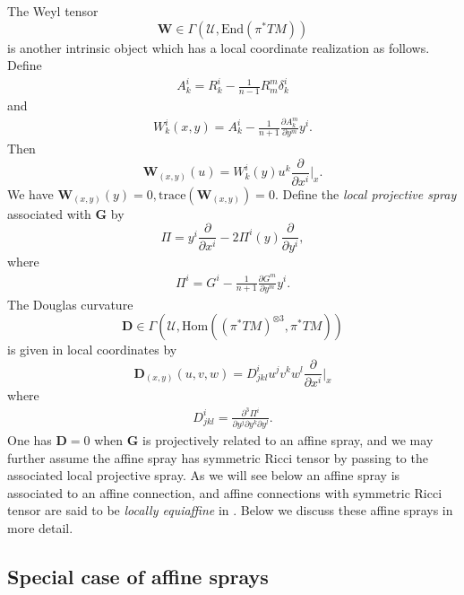 \documentclass{article}
\newcommand{\bG}{\mathbf{G}}
\numberwithin{equation}{section}
\theoremstyle{plain}
\begin{document}
The Weyl tensor 
\begin{equation}
\mathbf{W} \in \Gamma(\mathcal U, \mathrm{End}(\pi^* TM))
\end{equation}
 is another intrinsic object which has a local coordinate realization as follows. Define 
\begin{align}
    A_k^i = R_k^i - \frac{1}{n-1} R_m^m \delta_k^i
\end{align}
and 
\begin{align}
    W_k^i(x,y) = A_k^i - \frac{1}{n+1} \frac{\partial A_k^m}{\partial y^m} y^i.
\end{align}
Then 
\begin{equation}
\mathbf W_{(x,y)}(u) = W_k^i(y) u^k \frac{\partial}{\partial x^i}|_x.
\end{equation}
 We have $\mathbf W_{(x,y)}(y) = 0, \mathrm{trace}(\mathbf W_{(x,y)}) = 0$. 
Define the \emph{local projective spray} associated with $\bG$ by
\begin{equation}
\Pi = y^i \frac{\partial}{\partial x^i} - 2\Pi^i(y) \frac{\partial}{\partial y^i},
\end{equation}
 where
\begin{align}
    \Pi^i = G^i - \frac{1}{n+1} \frac{\partial G^m}{\partial y^m}y^i.
\end{align}
The Douglas curvature 
\begin{equation}
\mathbf D \in \Gamma(\mathcal U, \mathrm{Hom}((\pi^* TM)^{\otimes 3}, \pi^* TM))
\end{equation}
 is given in local coordinates by 
 \begin{equation}
 \mathbf D_{(x,y)}(u,v,w) = D^i_{jkl}u^j v^k w^l \frac{\partial}{\partial x^i}|_x
 \end{equation}
  where 
\begin{align}
    D_{jkl}^i = \frac{\partial^3 \Pi^i}{\partial y^j \partial y^k \partial y^l}.
\end{align}
One has $\mathbf D = 0$ when $\mathbf G$ is projectively related to an affine spray, and we may further assume the affine spray has symmetric Ricci tensor by passing to the associated local projective spray. As we will see below an affine spray is associated to an affine connection, and affine connections with symmetric Ricci tensor are said to be \emph{locally equiaffine} in \cite[Chapter 1.3]{affDiffGeoKatsumi}.
Below we discuss these affine sprays in more detail. 

\subsection{Special case of affine sprays}\label{subsec: appendix affine}
\end{document}
